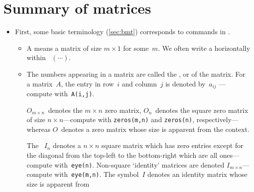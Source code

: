 
\section{Summary of matrices}
\label{sec:summ}

\begin{itemize}
\def\index#1{}%

\subsubsection{Matrix operations and algebra}

\item First, some basic terminology (\cref{sec:bmt}) corresponds to commands in \script.
\begin{itemize}
\itemhi A  is a rectangular array of real numbers, written inside ~\(\begin{bmatrix} \cdots  \end{bmatrix}\)---create in \script\ via \verb|[...;...;...]|.

\itemhi The  of a matrix is written \(m\times n\) where \(m\)~is the number of rows and \(n\)~is the number of columns---compute with \verb|size(A)| for matrix~\verb|A|.
If \(m=n\)\,, then it is called a .

\item A  means a matrix of size \(m\times 1\) for some~\(m\).
We often write a  horizontally within ~\((\cdots )\).

\item The numbers appearing in a matrix are called the ,  or  of the matrix.
For a matrix~\(A\), the entry in row~\(i\) and column~\(j\) is denoted by~\(a_{ij}\) ---compute with~\verb|A(i,j)|.

\itemme \(O_{m\times n}\)~denotes the \(m\times n\) zero matrix, \(O_n\)~denotes the square zero matrix of size \(n\times n\)---compute with \verb|zeros(m,n)| and \verb|zeros(n)|, respectively---whereas \(O\)~denotes a zero matrix whose size is apparent from the context.

\itemme The ~\(I_n\) denotes a \(n\times n\) square matrix which has zero entries except for the diagonal from the top-left to the bottom-right which are all ones---compute with~\index{eye()@\texttt{eye()}}\verb|eye(n)|.
Non-square `identity' matrices are denoted \(I_{m\times n}\)---compute with~\verb|eye(m,n)|.
The symbol~\(I\) denotes an identity matrix whose size is apparent from 


\end{itemize}
\end{itemize}
